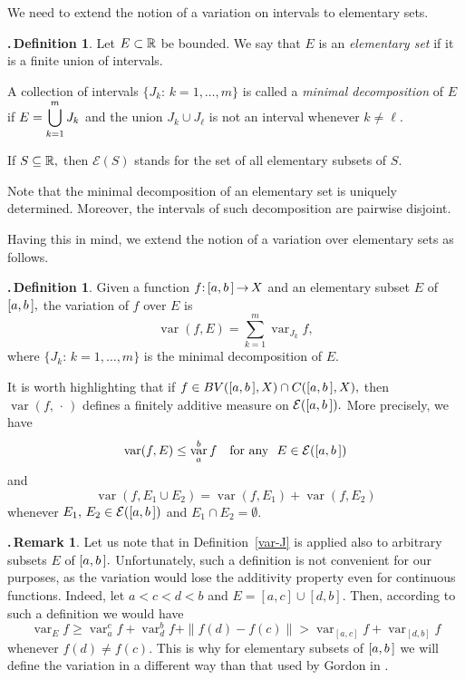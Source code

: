 \documentclass[12pt,twoside]{article}
\numberwithin{equation}{section}
\theoremstyle{plain}
\theoremstyle{definition}
\newtheorem{definition}[theorem]{\hskip-1mm.\,Definition}
\newtheorem{remark}[theorem]{\hskip-1mm.\,Remark}
\DeclareMathOperator{\var}{var}
\begin{document}
{\smallskip

We need to extend the notion of a variation on intervals to elementary sets.

\smallskip

\begin{definition}
Let $E\subset{\mathbb R}$ be bounded. We say that $E$ is an {\em elementary set} if it is
a finite union of intervals.

\smallskip

A collection of intervals $\{J_k{:}\,k=1,\dots,m\}$ is called a {\em minimal
decomposition} of $E$ if $\displaystyle E=\bigcup_{k=1}^m J_k$ and the union $J_k\cup J_\ell$
is not an interval whenever $k\ne\ell.$

\smallskip

If $S\subseteq{\mathbb R},$ then $\mathcal E(S)$ stands for the set of all elementary subsets of $S.$
\end{definition}

\smallskip

Note that the minimal decomposition of an elementary set is uniquely determined. Moreover,
the intervals of such decomposition are pairwise disjoint.

\smallskip

Having this in mind, we extend the notion of a variation over elementary sets as follows.

\smallskip

\begin{definition}\label{D4.8}
Given a function $f{:}\,[a,b\,]\,{\to}\,X$ and an elementary subset $E$ of $[a,b\,],$ the variation
of $f$ over $E$ is
\[
   \var(f,E)=\sum_{k=1}^m\var_{J_k}f,
\]
where $\{J_k{:}\,k=1,\dots,m\}$ is the minimal decomposition of $E.$
\end{definition}

\smallskip

It is worth highlighting that if $f\in BV([a,b\,],X)\cap C([a,b\,],X),$ then
$\var(f,\,\cdot\,)$ defines a finitely additive measure on $\mathcal E([a,b\,]).$
More precisely, we have
\[
    \var(f,E)\le\var_a^bf  \quad\mbox{for any \ } E\in\mathcal{E}(\ab)
\]
and
\[
   \var(f,E_1\cup E_2)=\var(f,E_1)+\var(f,E_2)
\]
whenever $E_1,\,E_2\in\mathcal E([a,b\,])$ and $E_1\cap E_2=\emptyset.$

\smallskip

\begin{remark}\label{P4.9}
Let us note that in \cite{G} Definition~\ref{var-J} is applied also to arbitrary
subsets $E$ of $[a,b\,].$ Unfortunately, such a definition is not convenient
for our purposes, as the variation would lose the additivity property even
for continuous functions. Indeed, let $a<c<d<b$ and $E=[a,c]\cup[d,b].$  Then,
according to such a definition we would have
\[
    \var_Ef\ge\var_a^cf+\var_d^bf+\|f(d)-f(c)\|>\var_{[a,c]}f+\var_{[d,b]}f
\]
whenever $f(d)\ne f(c).$ This is why for elementary subsets of $[a,b\,]$ we will define
the variation in a different way than that used by Gordon in \cite{G}.
\end{remark}

}
\end{document}

